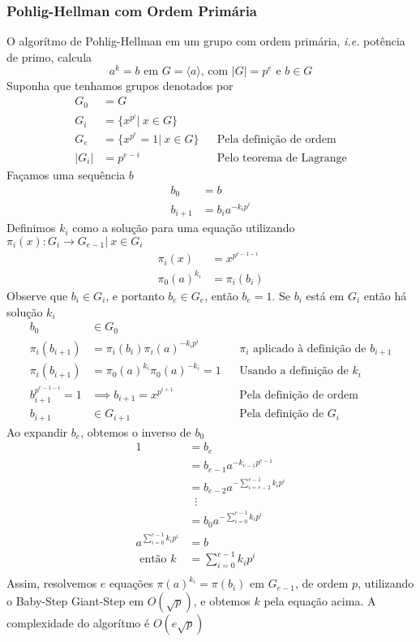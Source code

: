 \documentclass{article}
\begin{document}
\subsubsection{Pohlig-Hellman com Ordem Primária}
O algorítmo de Pohlig-Hellman em um grupo com ordem primária, \emph{i.e.} potência de primo, calcula
$$ a^k = b \text{ em } G = \langle a \rangle\text{, com }|G| = p^e\text{ e }b \in G$$
Suponha que tenhamos grupos denotados por
\begin{align*}
    G_0 &= G\\
    G_i &= \lbrace x^{p^i} \vert\ x \in G \rbrace\\
    G_e &= \lbrace x^{p^e} = 1 \vert\ x \in G \rbrace   &&\text{Pela definição de ordem}\\
  |G_i| &= p^{e-i}                                      &&\text{Pelo teorema de Lagrange}
\end{align*}
Façamos uma sequência $b$
\begin{align*}
    b_0 &= b\\
    b_{i+1} &= b_i a^{-k_i p^{i}}
\end{align*}
Definimos $k_i$ como a solução para uma equação utilizando $\pi_i(x) : G_i \rightarrow G_{e-1} |\ x \in G_i$
\begin{align*}
    \pi_i(x) &= x^{p^{e-1-i}}\\
    \pi_0(a)^{k_i} &= \pi_i(b_i)
\end{align*}
Observe que $b_i \in G_i$, e portanto $b_e \in G_e$, então $b_e = 1$. Se $b_i$ está em $G_i$ então há solução $k_i$
\begin{align*}
    b_0 &\in G_0\\
    \pi_i(b_{i+1}) &= \pi_i(b_i)\pi_i(a)^{-k_ip^i}          &&\text{$\pi_i$ aplicado à definição de $b_{i+1}$}\\
    \pi_i(b_{i+1}) &= \pi_0(a)^{k_i}\pi_0(a)^{-k_i} = 1     &&\text{Usando a definição de $k_i$}\\
    b_{i+1}^{p^{e-1-i}} = 1 &\implies b_{i+1} = x^{p^{i+1}} &&\text{Pela definição de ordem}\\
    b_{i+1} &\in G_{i+1}                                    &&\text{Pela definição de $G_i$}
\end{align*}
Ao expandir $b_e$, obtemos o inverso de $b_0$
\begin{align*}
    1 &= b_e\\
    &= b_{e-1}a^{-k_{e-1} p^{e-1}}\\
    &= b_{e-2}a^{-\sum_{i=e-2}^{e-1}{k_i p^i}}\\
    &\;\;\vdots\\
    &= b_{0}a^{-\sum_{i=0}^{e-1}{k_i p^i}}\\
    a^{\sum_{i=0}^{e-1}{k_i p^i}} &= b\\
  \text{ então } k &= \sum_{i=0}^{e-1}{k_i p^i}\\
\end{align*}
Assim, resolvemos $e$ equações $\pi(a)^{k_i} = \pi(b_i)$ em $G_{e-1}$, de ordem $p$, utilizando o Baby-Step Giant-Step em $O(\sqrt{p})$, e obtemos $k$ pela equação acima. A complexidade do algorítmo é $O(e\sqrt{p})$
\end{document}
